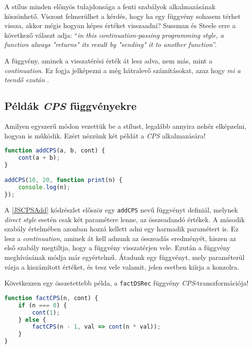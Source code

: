 A stílus minden előnyös tulajdonsága a fenti szabályok alkalmazásának köszönhető. Viszont felmerülhet a kérdés, hogy ha egy függvény sohasem térhet vissza, akkor mégis hogyan képes értéket visszaadni? Sussman és Steele \citeyear{Sussman1975} erre a következő választ adja: ``\textit{\textellipsis in this continuation-passing programming style, a function always "returns" its result by "sending" it to another function}''. 

A függvény, aminek a visszatérési érték át lesz adva, nem más, mint a \textit{continuation}. Ez fogja jelképezni a még hátralevő számításokat, azaz hogy \textit{mi a teendő ezután} \cite{CompCont}.

\subsection{Példák \textit{CPS} függvényekre}

Amilyen egyszerű módon vezettük be a stílust, legalább annyira nehéz elképzelni, hogyan is működik. Ezért nézzünk két példát a \textit{CPS} alkalmazására!

\begin{lstlisting}[language=JavaScript, caption={\textit{CPS} összeadást végző függvény JavaScriptben}, captionpos=b, label=JSCPSAdd]
function addCPS(a, b, cont) {
    cont(a + b);
}

addCPS(10, 20, function print(n) {
    console.log(n);
});
\end{lstlisting}

A \ref{JSCPSAdd} kódrészlet először egy \texttt{addCPS} nevű függvényt definiál, melynek \textit{direct style} esetén csak két paramétere lenne, az összeadandó értékek. A második szabály értelmében azonban hozzá kellett adni egy harmadik paramétert is. Ez lesz a \textit{continuation}, aminek át kell adnunk az összeadás eredményét, hiszen az első szabály megtiltja, hogy a függvény visszatérjen vele. Ezután a függvény meghívásának módja már egyértelmű. Átadunk egy függvényt, mely paraméterül várja a kiszámított értéket, és tesz vele valamit, jelen esetben kiírja a konzolra.

Következzen egy összetettebb példa, a \texttt{factDSRec} függvény \textit{CPS}-transzformációja!

\begin{lstlisting}[language=JavaScript, caption={\textit{CPS} faktoriálist kiszámító függvény JavaScriptben}, captionpos=b, label=JSCPSFact]
function factCPS(n, cont) {
    if (n === 0) {
        cont(1);
    } else {
        factCPS(n - 1, val => cont(n * val));
    }
}
\end{lstlisting}

